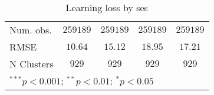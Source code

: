\begin{table}
\begin{center}
\begin{tabular}{l c c c c}
Num. obs.                   & $259189$      & $259189$      & $259189$      & $259189$      \\
RMSE                        & $10.64$       & $15.12$       & $18.95$       & $17.21$       \\
N Clusters                  & $929$         & $929$         & $929$         & $929$         \\
\hline
\multicolumn{5}{l}{\scriptsize{$^{***}p<0.001$; $^{**}p<0.01$; $^{*}p<0.05$}}
\end{tabular}
\caption{Learning loss by ses}
\label{tableses}
\end{center}
\end{table}
